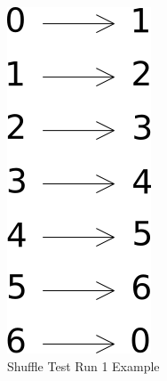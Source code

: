 \begin{figure}[h!]
\centering
\includegraphics{figures/shuffle.png}
\caption{Shuffle Test Run 1 Example}
\label{fig:slicetest}
\end{figure}